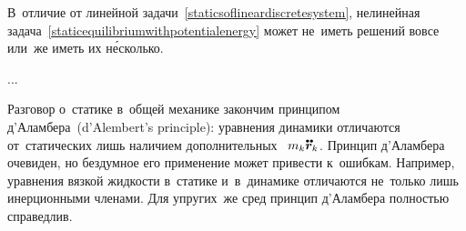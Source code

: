 \begin{otherlanguage}{russian}
В~отличие от линейной задачи~\eqref{staticsoflineardiscretesystem}, нелинейная задача~\eqref{staticequilibriumwithpotentialenergy} может не~иметь решений вовсе или~же иметь их н\'{е}сколько.

...

Разговор о~статике в~общей механике закончим принципом \hbox{д’\hspace{-0.2ex}Аламбера}~(\hbox{d’\hspace{-0.2ex}Alembert}’s principle): уравнения динамики отличаются от~статических лишь наличием дополнительных ~${m_k \mathdotdotabove{\bm{r}}_k}$. Принцип \hbox{д’\hspace{-0.2ex}Аламбера} очевиден, но бездумное его применение может привести к~ошибкам. Например, уравнения вязкой жидкости в~статике и~в~динамике отличаются не~только лишь инерционными членами. Для упругих~же сред принцип \hbox{д’\hspace{-0.2ex}Аламбера} полностью справедлив.

\end{otherlanguage}



\label{para:mechanicsofrelativemotion}

